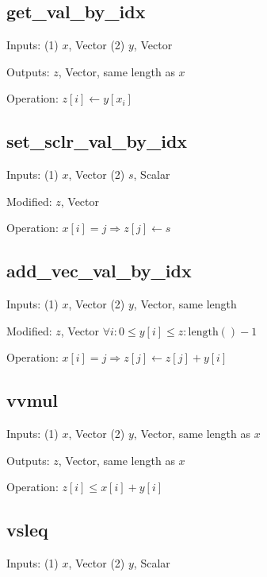 \subsection{get\_val\_by\_idx}
\label{get_val_by_idx}
\bi
\item Inputs: (1) \(x\), Vector  (2) \(y\), Vector

\item Outputs: \(z\), Vector, same length as \(x\)

\item Operation: \(z[i] \leftarrow y[x_i]\)
\ei

\subsection{set\_sclr\_val\_by\_idx}
\label{set_sclr_val_by_idx}
\bi
\item Inputs: (1) \(x\), Vector  (2) \(s\), Scalar

\item Modified: \(z\), Vector

\item Operation: \(x[i] = j \Rightarrow z[j] \leftarrow s\)
\ei

\subsection{add\_vec\_val\_by\_idx}
\label{add_vec_val_by_idx}
\bi
\item Inputs: (1) \(x\), Vector  (2) \(y\), Vector, same length

\item Modified: \(z\), Vector \(\forall i: 0 \leq y[i] \leq z:\mathrm{length}() - 1\)

\item Operation: \(x[i] = j \Rightarrow z[j] \leftarrow z[j] + y[i]\)
\ei


\subsection{vvmul}
\label{vvmul}
\bi
\item Inputs: (1) \(x\), Vector  (2) \(y\), Vector, same length as \(x\)

\item Outputs: \(z\), Vector, same length as \(x\)

\item Operation: \(z[i] \leq x[i] + y[i]\)
\ei

\subsection{vsleq}
\label{vsleq}
\bi
\item Inputs: (1) \(x\), Vector  (2) \(y\), Scalar

